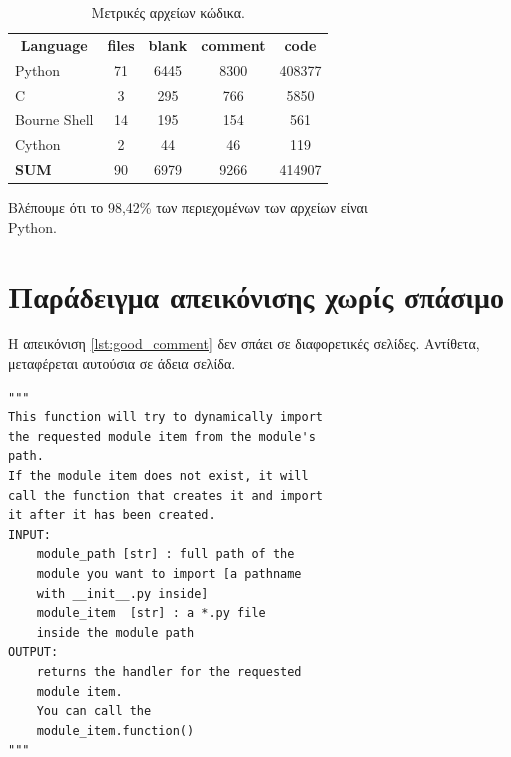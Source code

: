 \documentclass[12pt,a4paper]{report}%
\begin{document}
\begin{table}[!htbp]
\centering
\caption{Μετρικές αρχείων κώδικα.}
\label{tbl:code_files_metrics}
\begin{tabular}{|l|cccc|}
\hline
\multicolumn{1}{|c|}{\textbf{Language}} & \textbf{files} & \textbf{blank} & \textbf{comment} & \textbf{code} \\
Python                                  & 71             & 6445           & 8300             & 408377        \\
C                                       & 3              & 295            & 766              & 5850          \\
Bourne Shell                            & 14             & 195            & 154              & 561           \\
Cython                                  & 2              & 44             & 46               & 119           \\ \hline
\textbf{SUM}                            & 90             & 6979           & 9266             & 414907        \\ \hline
\end{tabular}
\end{table}

Βλέπουμε ότι το 98,42\% των περιεχομένων των αρχείων είναι\\
Python.

\section{Παράδειγμα απεικόνισης χωρίς σπάσιμο}
Η απεικόνιση \ref{lst:good_comment} δεν σπάει σε διαφορετικές σελίδες.
Αντίθετα, μεταφέρεται αυτούσια σε άδεια σελίδα.

\noindent\begin{minipage}{\linewidth}
\begin{lstlisting}[language=lang1,label=lst:good_comment,
caption=Διατήρηση απεικόνισης στην ίδια σελίδα.]
"""
This function will try to dynamically import
the requested module item from the module's
path.
If the module item does not exist, it will
call the function that creates it and import
it after it has been created.
INPUT:
    module_path [str] : full path of the
    module you want to import [a pathname
    with __init__.py inside]
    module_item  [str] : a *.py file
    inside the module path
OUTPUT:
    returns the handler for the requested
    module item.
    You can call the
    module_item.function()
"""
\end{lstlisting}
\end{minipage}




{\footnotesize
}
\end{document}
